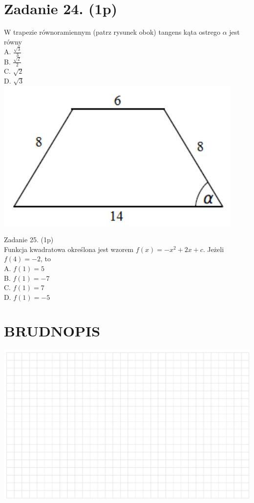 \documentclass[10pt]{article}
\begin{document}
\section*{Zadanie 24. (1p)}
W trapezie równoramiennym (patrz rysunek obok) tangens kąta ostrego \(\alpha\) jest równy\\
A. \(\frac{\sqrt{3}}{3}\)\\
B. \(\frac{\sqrt{2}}{2}\)\\
C. \(\sqrt{2}\)\\
D. \(\sqrt{3}\)\\
\includegraphics[max width=\textwidth, center]{2024_11_21_b63ac6eb3d78a57ac924g-07(1)}

Zadanie 25. (1p)\\
Funkcja kwadratowa określona jest wzorem \(f(x)=-x^{2}+2 x+c\). Jeżeli \(f(4)=-2\), to\\
A. \(f(1)=5\)\\
B. \(f(1)=-7\)\\
C. \(f(1)=7\)\\
D. \(f(1)=-5\)

\section*{BRUDNOPIS}
\begin{center}
\includegraphics[max width=\textwidth]{2024_11_21_b63ac6eb3d78a57ac924g-07(2)}
\end{center}
\end{document}
